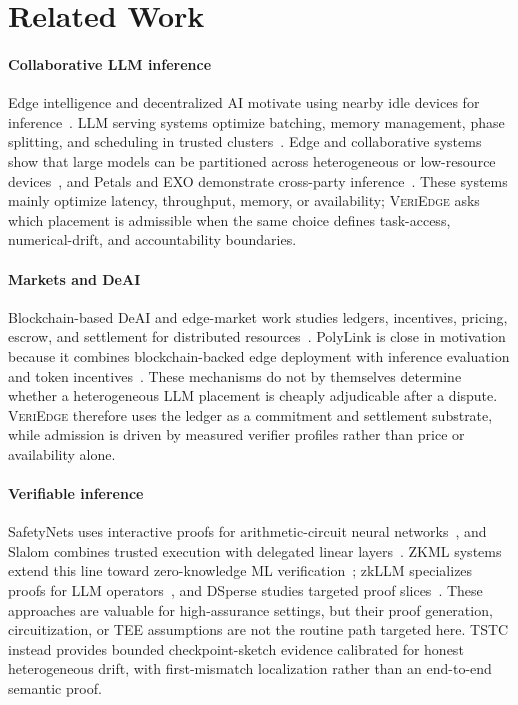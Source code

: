\documentclass[sigplan,screen,review,anonymous]{acmart}
\newcommand{\system}{\textsc{VeriEdge}\xspace}
\begin{document}
\section{Related Work}
\paragraph{Collaborative LLM inference}
Edge intelligence and decentralized AI motivate using nearby idle devices for
inference~\cite{deng2020edge,meuser2024revisiting,wang2024sok}. LLM serving
systems optimize batching, memory management, phase splitting, and scheduling
in trusted clusters~\cite{yu2022orca,kwon2023vllm,patel2024splitwise,
	mei2024helix}. Edge and collaborative systems show that large models can
be partitioned across heterogeneous or low-resource devices~\cite{
	hu2022pipeedge,zhao2024hetegen,li2024tpillm}, and Petals and EXO
demonstrate cross-party inference~\cite{borzunov2023petals,exo_github}.
These systems mainly
optimize latency, throughput, memory, or availability; \system asks which
placement is admissible when the same choice defines task-access,
numerical-drift, and accountability boundaries.

\paragraph{Markets and DeAI}
Blockchain-based DeAI and edge-market work studies ledgers, incentives,
pricing, escrow, and settlement for distributed resources~\cite{
	wang2024sok,baranwal2024blockchain,li2023double,habiba2024auction}.
PolyLink is close in motivation because it combines blockchain-backed edge
deployment with inference evaluation and token incentives~\cite{
	liu2025polylink}. These mechanisms do not by themselves determine whether
a heterogeneous LLM placement is cheaply adjudicable after a dispute.
\system therefore uses the ledger as a commitment and settlement substrate,
while admission is driven by measured verifier profiles rather than price or
availability alone.

\paragraph{Verifiable inference}
SafetyNets uses interactive proofs for arithmetic-circuit neural
networks~\cite{ghodsi2017safetynets}, and Slalom combines trusted execution
with delegated linear layers~\cite{tramer2019slalom}. ZKML systems extend
this line toward zero-knowledge ML verification~\cite{peng2025survey};
zkLLM specializes proofs for LLM operators~\cite{sun2024zkllm}, and DSperse
studies targeted proof slices~\cite{ivanov2025dsperse}. These approaches are
valuable for high-assurance settings, but their proof generation,
circuitization, or TEE assumptions are not the routine path targeted here.
TSTC instead provides bounded checkpoint-sketch evidence
calibrated for honest heterogeneous drift, with first-mismatch localization
rather than an end-to-end semantic proof.
\end{document}
